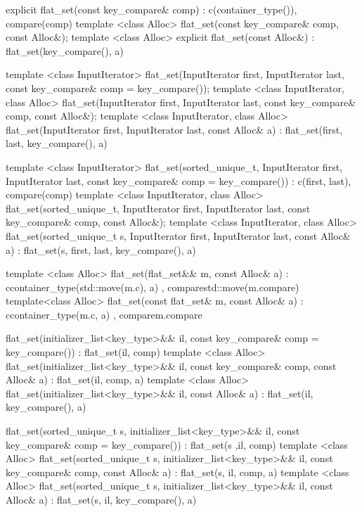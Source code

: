 \begin{codeblock}
\begin{codeblock}
\begin{codeblock}
\begin{addedblock}
\begin{codeblock}
{{    explicit flat_set(const key_compare& comp)
      : c(container_type()), compare(comp) { }
    template <class Alloc>
      flat_set(const key_compare& comp, const Alloc&);
    template <class Alloc>
      explicit flat_set(const Alloc&) 
        : flat_set(key_compare(), a) { }

    template <class InputIterator>
      flat_set(InputIterator first, InputIterator last,
               const key_compare& comp = key_compare());
    template <class InputIterator, class Alloc>
      flat_set(InputIterator first, InputIterator last,
               const key_compare& comp, const Alloc&);
    template <class InputIterator, class Alloc>
      flat_set(InputIterator first, InputIterator last, const Alloc& a)
        : flat_set(first, last, key_compare(), a) { }

    template <class InputIterator>
      flat_set(sorted_unique_t, InputIterator first, InputIterator last,
               const key_compare& comp = key_compare())
        : c(first, last), compare(comp) { }
    template <class InputIterator, class Alloc>
      flat_set(sorted_unique_t, InputIterator first, InputIterator last,
               const key_compare& comp, const Alloc&);
    template <class InputIterator, class Alloc>
      flat_set(sorted_unique_t s, InputIterator first, InputIterator last,
               const Alloc& a)
        : flat_set(s, first, last, key_compare(), a) { }

    template <class Alloc>
      flat_set(flat_set&& m, const Alloc& a)
        : c{container_type(std::move(m.c), a)}
        , compare{std::move(m.compare)}
      { }
    template<class Alloc>
      flat_set(const flat_set& m, const Alloc& a)
        : c{container_type(m.c, a)}
        , compare{m.compare}
      { }

    flat_set(initializer_list<key_type>&& il,
             const key_compare& comp = key_compare())
        : flat_set(il, comp) { }
    template <class Alloc>
      flat_set(initializer_list<key_type>&& il,
               const key_compare& comp, const Alloc& a)
        : flat_set(il, comp, a) { }
    template <class Alloc>
      flat_set(initializer_list<key_type>&& il, const Alloc& a)
        : flat_set(il, key_compare(), a) { }

    flat_set(sorted_unique_t s, initializer_list<key_type>&& il,
             const key_compare& comp = key_compare()) 
        : flat_set(s ,il, comp) { }
    template <class Alloc>
      flat_set(sorted_unique_t s, initializer_list<key_type>&& il,
               const key_compare& comp, const Alloc& a) 
        : flat_set(s, il, comp, a) { }
    template <class Alloc>
      flat_set(sorted_unique_t s, initializer_list<key_type>&& il,
               const Alloc& a)
        : flat_set(s, il, key_compare(), a) { }

}}
\end{codeblock}
\end{addedblock}
\end{codeblock}
\end{codeblock}
\end{codeblock}
